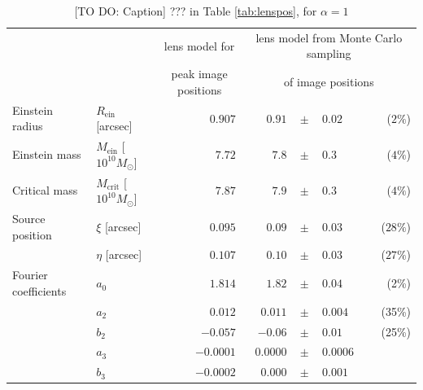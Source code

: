 
\begin{table}
\centering
\caption{[TO DO: Caption] ??? in Table \ref{tab:lenspos}, for $\alpha = 1$}
\begin{tabular}{llrrclr}
\hline
 &  & \multicolumn{1}{c}{lens model for} &\multicolumn{4}{c}{lens model from Monte Carlo sampling  } \\
 &  & \multicolumn{1}{c}{peak image positions}  & \multicolumn{4}{c}{of image positions }  \\ \hline
Einstein radius      & $R_\text{ein}$ [arcsec]             & $0.907$ & $0.91$  & $\pm$ & $     0.02$ & ($2\%$)\\
Einstein mass        & $M_\text{ein}$ [$10^{10} M_\odot$]  & $7.72$  & $7.8 $  & $\pm$ & $      0.3$ & ($4\%$) \\
Critical mass        & $M_\text{crit}$ [$10^{10} M_\odot$] & $7.87$  & $7.9$   & $\pm$ & $      0.3$ & ($4\%$)\\
Source position      & $\xi$ [arcsec]                      & $0.095$ & $0.09 $ & $\pm$ & $     0.03$ & ($28\%$)\\
                     & $\eta$ [arcsec]                     & $0.107$ & $0.10 $ & $\pm$ & $     0.03$ & ($27\%$)\\
Fourier coefficients & $a_0$                               & $1.814$ & $1.82 $ & $\pm$ & $   0.04$ & (2\%)\\
                     & $a_2$                               & $0.012$ & $ 0.011 $ & $\pm$ & $    0.004$ & (35\%)\\
                     & $b_2$                               & $-0.057$ & $-0.06 $  & $\pm$ & $  0.01$ & (25\%)\\
                     & $a_3$                               & $-0.0001$& $0.0000 $ & $\pm$ & $   0.0006$ & \\
                     & $b_3$                               & $-0.0002$&$0.000 $   & $\pm$ & $  0.001$ & \\\hline
\end{tabular}  
\label{tab:bestfitlensmodel} 
\end{table}


